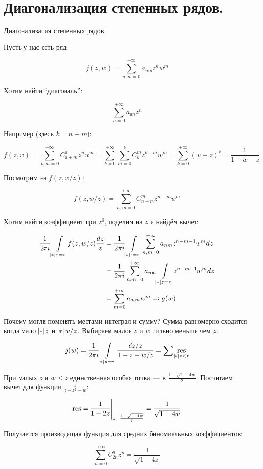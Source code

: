 \section{Диагонализация степенных рядов.}

\begin{example} \; Диагонализация степенных рядов

    Пусть у нас есть ряд:

    \[
        f(z, w) = \sum\limits_{n, m = 0}^{+\infty} a_{nm}z^nw^m
    \]

    Хотим найти ``диагональ'':

    \[
        \sum\limits_{n=0}^{+\infty} a_{nn}z^n
    \]

    Например (здесь $k = n + m$):

    \[
        f(z, w) = \sum\limits_{n, m = 0}^{+\infty}
        C_{n+m}^n z^nw^m
        = \sum\limits_{k=0}^{+\infty}
        \sum\limits_{m=0}^k C_k^m z^{k-m}w^m
        = \sum\limits_{k=0}^{+\infty}
        \left(w + z\right)^k
        = \frac{1}{1-w-z}
    \]

    Посмотрим на $f(z, w/z)$:

    \[
        f(z, w/z)
        =\sum\limits_{n, m = 0}^{+\infty} C_{n+m}^m z^{n-m}w^m
    \]

    Хотим найти коэффициент при $z^0$, поделим на $z$
    и найдём вычет:

    \begin{align*}
        \frac{1}{2\pi i}\int\limits_{\abs z=r} f(z, w/z) \frac{dz}{z}
            &= \frac{1}{2\pi i}\int\limits_{\abs z = r}
            \sum\limits_{n, m = 0}^{+\infty} a_{nm}z^{n-m-1}w^m
            dz \\ 
            &= \frac{1}{2\pi i}\sum\limits_{n, m = 0}^{+\infty} a_{nm}
            \int\limits_{\abs z = r} z^{n-m-1}w^mdz \\ 
            &= \sum\limits_{m=0}^{+\infty} a_{mm}w^m =: g(w)
    \end{align*}

    Почему могли поменять местами интеграл и сумму?
    Сумма равномерно сходится когда мало $\abs z$ и $\abs {w/z}$.
    Выбираем малое $z$ и $w$ сильно меньше чем $z$.

    \[
        g(w) = \frac{1}{2\pi i}\int\limits_{\abs z = r}
        \frac{dz/z}{1-z-w/z} = \sum\res\limits_{\abs z < r}
    \]

    При малых $z$ и $w < z$ единственная
    особая точка~--- в $\frac{1-\sqrt{1-4w}}{2}$.
    Посчитаем вычет для функции $\frac{1}{z-z^2-w}$:

    \[
        \res = \eval{\frac{1}{1-2z}}_{z=\frac{1-\sqrt{1-4w}}{2}}
        = \frac{1}{\sqrt{1-4w}}
    \]

    Получается производящая функция для средних биномиальных коэффициентов:

    \[
        \sum\limits_{n=0}^{+\infty} C_{2n}^n z^n = \frac{1}{\sqrt{1-4z}}
    \]

\end{example}


\newpage
